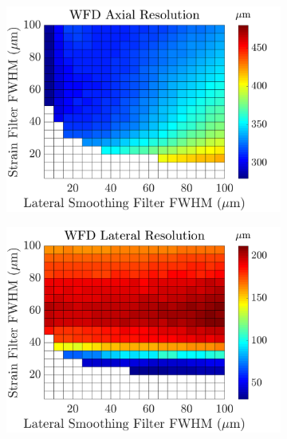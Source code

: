 \begin{figure}[h!]
\begin{subfigure}{0.49\textwidth}
		\includegraphics[width=\textwidth]{imageres_figs/wfd_axial.png}
	\end{subfigure}
	\begin{subfigure}{0.49\textwidth}
		\centering
		\includegraphics[width=\textwidth]{imageres_figs/wfd_lateral.png}
	\end{subfigure}
	\\
	\begin{subfigure}{0.49\textwidth}
		\centering

\end{subfigure}
\end{figure}
